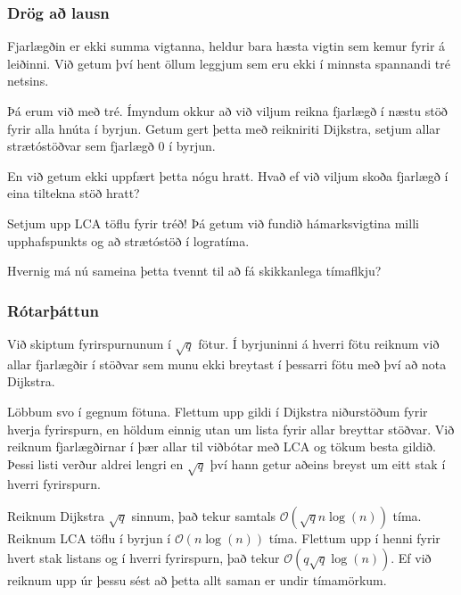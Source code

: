 {
    \frametitle{Drög að lausn}
    {
        \item<1-> Fjarlægðin er ekki summa vigtanna, heldur bara hæsta vigtin sem kemur fyrir á leiðinni. Við getum því hent öllum leggjum
            sem eru ekki í minnsta spannandi tré netsins. 
        \item<2-> Þá erum við með tré. Ímyndum okkur að við viljum reikna fjarlægð í næstu stöð fyrir alla hnúta í byrjun. Getum gert þetta
            með reikniriti Dijkstra, setjum allar strætóstöðvar sem fjarlægð $0$ í byrjun.
        \item<3-> En við getum ekki uppfært þetta nógu hratt. Hvað ef við viljum skoða fjarlægð í eina tiltekna stöð hratt?
        \item<4-> Setjum upp LCA töflu fyrir tréð! Þá getum við fundið hámarksvigtina milli upphafspunkts og að strætóstöð í logratíma.
        \item<5-> Hvernig má nú sameina þetta tvennt til að fá skikkanlega tímaflkju?
    }
}

{
    \frametitle{Rótarþáttun}
    {
        \item<1-> Við skiptum fyrirspurnunum í $\sqrt{q}$ fötur. Í byrjuninni á hverri fötu reiknum við allar fjarlægðir í stöðvar sem munu
            ekki breytast í þessarri fötu með því að nota Dijkstra.
        \item<2-> Löbbum svo í gegnum fötuna. Flettum upp gildi í Dijkstra niðurstöðum fyrir hverja fyrirspurn, en höldum einnig utan um
            lista fyrir allar breyttar stöðvar. Við reiknum fjarlægðirnar í þær allar til viðbótar með LCA og tökum besta gildið. Þessi
            listi verður aldrei lengri en $\sqrt{q}$ því hann getur aðeins breyst um eitt stak í hverri fyrirspurn.
        \item<3-> Reiknum Dijkstra $\sqrt{q}$ sinnum, það tekur samtals $\mathcal{O}(\sqrt{q}n\log(n))$ tíma. Reiknum LCA töflu í byrjun
            í $\mathcal{O}(n\log(n))$ tíma. Flettum upp í henni fyrir hvert stak listans og í hverri fyrirspurn, það tekur 
            $\mathcal{O}(q\sqrt{q}\log(n))$. Ef við reiknum upp úr þessu sést að þetta allt saman er undir tímamörkum.
    }
}


